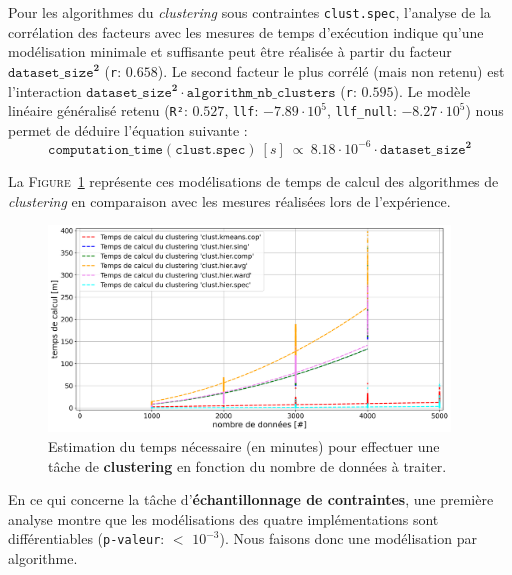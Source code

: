 			Pour les algorithmes du \textit{clustering} sous contraintes \texttt{clust.spec}, l'analyse de la corrélation des facteurs avec les mesures de temps d'exécution indique qu'une modélisation minimale et suffisante peut être réalisée à partir du facteur $\texttt{dataset\_size}^{\textbf{2}}$ (\texttt{r}: $0.658$).
			Le second facteur le plus corrélé (mais non retenu) est l'interaction $\texttt{dataset\_size}^{\textbf{2}} \cdot \texttt{algorithm\_nb\_clusters}$ (\texttt{r}: $0.595$).
			Le modèle linéaire généralisé retenu (\texttt{R²}: $0.527$, \texttt{llf}: $-7.89 \cdot 10^{5}$, \texttt{llf\_null}: $-8.27 \cdot 10^{5}$) nous permet de déduire l'équation suivante :
			\begin{equation}
				\texttt{computation\_time}(\texttt{clust.spec})~[s]~
				\propto~8.18 \cdot 10^{-6} \cdot \texttt{dataset\_size}^{\textbf{2}}
			\end{equation}
			
			La \textsc{Figure~\ref{figure:4.3.2-ETUDE-COUTS-TEMPS-CALCUL-MODELISATION-CLUSTERING}} représente ces modélisations de temps de calcul des algorithmes de \textit{clustering} en comparaison avec les mesures réalisées lors de l'expérience.
			\newline
			\begin{figure}[!htb]
				\centering
				\includegraphics[width=0.95\textwidth]{figures/etude-temps-calcul-modelisation-3clust}
				\caption{
					Estimation du temps nécessaire (en minutes) pour effectuer une tâche de \textbf{clustering} en fonction du nombre de données à traiter.
				}
				\label{figure:4.3.2-ETUDE-COUTS-TEMPS-CALCUL-MODELISATION-CLUSTERING}
			\end{figure}
			
			
			En ce qui concerne la tâche d'\textbf{échantillonnage de contraintes}, une première analyse montre que les modélisations des quatre implémentations sont différentiables  (\texttt{p-valeur}: $<$ \texttt{$10^{-3}$}). Nous faisons donc une modélisation par algorithme.
			
